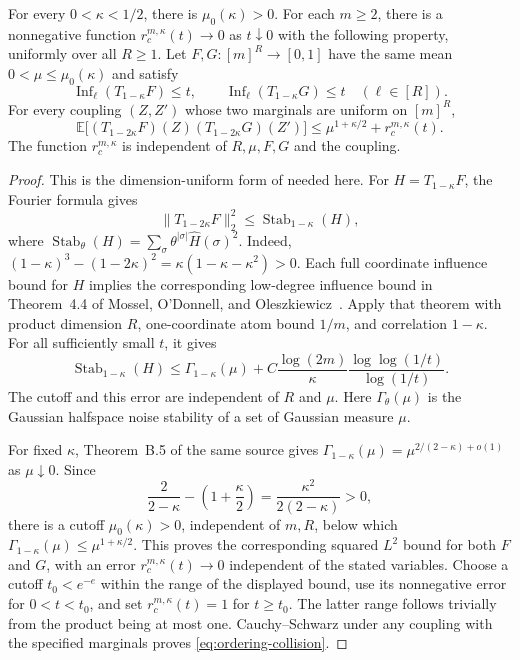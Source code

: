 \begin{lemma}\label{lem:ordering-collision}
For every \(0<\kappa<1/2\), there is \(\mu_0(\kappa)>0\).  For
each \(m\ge2\), there is a nonnegative function
\(r_c^{m,\kappa}(t)\to0\) as \(t\downarrow0\) with the following
property, uniformly over all \(R\ge1\).  Let
\(F,G:[m]^R\to[0,1]\) have the same mean
\(0<\mu\le\mu_0(\kappa)\) and satisfy
\[
 \operatorname{Inf}_\ell(T_{1-\kappa}F)\le t,\qquad
 \operatorname{Inf}_\ell(T_{1-\kappa}G)\le t
 \quad(\ell\in[R]).
\]
For every coupling \((Z,Z')\) whose two marginals are uniform on
\([m]^R\),
\begin{equation}
 \mathbb E\bigl[
   (T_{1-2\kappa}F)(Z)(T_{1-2\kappa}G)(Z')\bigr]
 \le \mu^{1+\kappa/2}+r_c^{m,\kappa}(t).
\label{eq:ordering-collision}
\end{equation}
The function \(r_c^{m,\kappa}\) is independent of \(R,\mu,F,G\)
and the coupling.
\end{lemma}

\begin{proof}
This is the dimension-uniform form of
\cite[Lemmas~3.4 and~3.5]{GuruswamiEtAl2011OrderingCSP} needed here.
For \(H=T_{1-\kappa}F\), the Fourier formula gives
\[
 \|T_{1-2\kappa}F\|_2^2
 \le \operatorname{Stab}_{1-\kappa}(H),
\]
where \(\operatorname{Stab}_\theta(H)
=\sum_\sigma\theta^{|\sigma|}\widehat H(\sigma)^2\).
Indeed,
\((1-\kappa)^3-(1-2\kappa)^2
=\kappa(1-\kappa-\kappa^2)>0\).
Each full coordinate influence bound for \(H\) implies the corresponding
low-degree influence bound in Theorem~4.4 of Mossel, O'Donnell, and
Oleszkiewicz~\cite{MOO10}.  Apply that theorem with product dimension
\(R\), one-coordinate atom bound \(1/m\), and correlation \(1-\kappa\).
For all sufficiently small \(t\), it gives
\[
 \operatorname{Stab}_{1-\kappa}(H)
 \le \Gamma_{1-\kappa}(\mu)
 +C\frac{\log(2m)}{\kappa}
       \frac{\log\log(1/t)}{\log(1/t)}.
\]
The cutoff and this error are independent of \(R\) and \(\mu\).
Here \(\Gamma_\theta(\mu)\) is the Gaussian halfspace noise stability
of a set of Gaussian measure \(\mu\).

For fixed \(\kappa\), Theorem~B.5 of the same source gives
\(\Gamma_{1-\kappa}(\mu)=\mu^{2/(2-\kappa)+o(1)}\) as
\(\mu\downarrow0\).  Since
\[
 \frac{2}{2-\kappa}-\left(1+\frac{\kappa}{2}\right)
 =\frac{\kappa^2}{2(2-\kappa)}>0,
\]
there is a cutoff \(\mu_0(\kappa)>0\), independent of \(m,R\), below
which \(\Gamma_{1-\kappa}(\mu)\le\mu^{1+\kappa/2}\).
This proves the corresponding squared \(L^2\) bound for both \(F\)
and \(G\), with an error \(r_c^{m,\kappa}(t)\to0\) independent of
the stated variables.  Choose a cutoff \(t_0<e^{-e}\) within the
range of the displayed bound, use its nonnegative error for
\(0<t<t_0\), and set \(r_c^{m,\kappa}(t)=1\) for \(t\ge t_0\).
The latter range follows trivially from the product being at most one.
Cauchy--Schwarz under any coupling with the
specified marginals proves \eqref{eq:ordering-collision}.
\end{proof}

